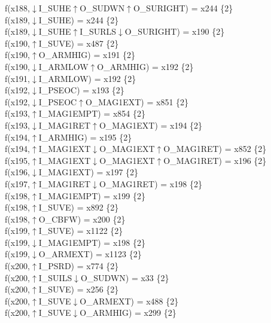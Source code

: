 f(x188,$\downarrow$I\_SUHE$\uparrow$O\_SUDWN$\uparrow$O\_SURIGHT) = x244 \{2\} \\  
f(x189,$\downarrow$I\_SUHE) = x244 \{2\} \\  
f(x189,$\downarrow$I\_SUHE$\uparrow$I\_SURLS$\downarrow$O\_SURIGHT) = x190 \{2\} \\  
f(x190,$\uparrow$I\_SUVE) = x487 \{2\} \\  
f(x190,$\uparrow$O\_ARMHIG) = x191 \{2\} \\  
f(x190,$\downarrow$I\_ARMLOW$\uparrow$O\_ARMHIG) = x192 \{2\} \\  
f(x191,$\downarrow$I\_ARMLOW) = x192 \{2\} \\  
f(x192,$\downarrow$I\_PSEOC) = x193 \{2\} \\  
f(x192,$\downarrow$I\_PSEOC$\uparrow$O\_MAG1EXT) = x851 \{2\} \\  
f(x193,$\uparrow$I\_MAG1EMPT) = x854 \{2\} \\  
f(x193,$\downarrow$I\_MAG1RET$\uparrow$O\_MAG1EXT) = x194 \{2\} \\  
f(x194,$\uparrow$I\_ARMHIG) = x195 \{2\} \\  
f(x194,$\uparrow$I\_MAG1EXT$\downarrow$O\_MAG1EXT$\uparrow$O\_MAG1RET) = x852 \{2\} \\  
f(x195,$\uparrow$I\_MAG1EXT$\downarrow$O\_MAG1EXT$\uparrow$O\_MAG1RET) = x196 \{2\} \\  
f(x196,$\downarrow$I\_MAG1EXT) = x197 \{2\} \\  
f(x197,$\uparrow$I\_MAG1RET$\downarrow$O\_MAG1RET) = x198 \{2\} \\  
f(x198,$\uparrow$I\_MAG1EMPT) = x199 \{2\} \\  
f(x198,$\uparrow$I\_SUVE) = x892 \{2\} \\  
f(x198,$\uparrow$O\_CBFW) = x200 \{2\} \\  
f(x199,$\uparrow$I\_SUVE) = x1122 \{2\} \\  
f(x199,$\downarrow$I\_MAG1EMPT) = x198 \{2\} \\  
f(x199,$\downarrow$O\_ARMEXT) = x1123 \{2\} \\  
f(x200,$\uparrow$I\_PSRD) = x774 \{2\} \\  
f(x200,$\uparrow$I\_SUILS$\downarrow$O\_SUDWN) = x33 \{2\} \\  
f(x200,$\uparrow$I\_SUVE) = x256 \{2\} \\  
f(x200,$\uparrow$I\_SUVE$\downarrow$O\_ARMEXT) = x488 \{2\} \\  
f(x200,$\uparrow$I\_SUVE$\downarrow$O\_ARMHIG) = x299 \{2\} \\  
